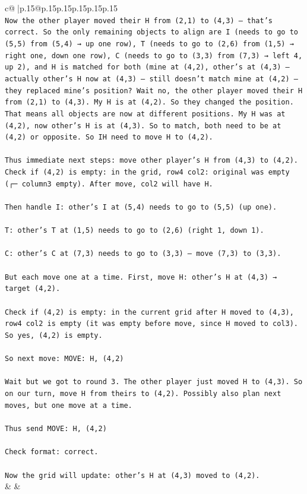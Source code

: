 \documentclass{article}
\begin{document}
{\begin{supertabular}{c@{$\;$}|p{.15\linewidth}@{}p{.15\linewidth}p{.15\linewidth}p{.15\linewidth}p{.15\linewidth}p{.15\linewidth}}
{{{\\ 
\texttt{Now the other player moved their H from (2,1) to (4,3) – that's correct. So the only remaining objects to align are I (needs to go to (5,5) from (5,4) → up one row), T (needs to go to (2,6) from (1,5) → right one, down one row), C (needs to go to (3,3) from (7,3) → left 4, up 2), and H is matched for both (mine at (4,2), other's at (4,3) – actually other's H now at (4,3) – still doesn't match mine at (4,2) – they replaced mine's position? Wait no, the other player moved their H from (2,1) to (4,3). My H is at (4,2). So they changed the position. That means all objects are now at different positions. My H was at (4,2), now other's H is at (4,3). So to match, both need to be at (4,2) or opposite. So IH need to move H to (4,2).} \\
\\ 
\texttt{Thus immediate next steps: move other player's H from (4,3) to (4,2). Check if (4,2) is empty: in the grid, row4 col2: original was empty (┌─ column3 empty). After move, col2 will have H.} \\
\\ 
\texttt{Then handle I: other's I at (5,4) needs to go to (5,5) (up one).} \\
\\ 
\texttt{T: other's T at (1,5) needs to go to (2,6) (right 1, down 1).} \\
\\ 
\texttt{C: other's C at (7,3) needs to go to (3,3) – move (7,3) to (3,3).} \\
\\ 
\texttt{But each move one at a time. First, move H: other's H at (4,3) → target (4,2).} \\
\\ 
\texttt{Check if (4,2) is empty: in the current grid after H moved to (4,3), row4 col2 is empty (it was empty before move, since H moved to col3). So yes, (4,2) is empty.} \\
\\ 
\texttt{So next move: MOVE: H, (4,2)} \\
\\ 
\texttt{Wait but we got to round 3. The other player just moved H to (4,3). So on our turn, move H from theirs to (4,2). Possibly also plan next moves, but one move at a time.} \\
\\ 
\texttt{Thus send MOVE: H, (4,2)} \\
\\ 
\texttt{Check format: correct.} \\
\\ 
\texttt{Now the grid will update: other's H at (4,3) moved to (4,2).} \\
            }
        }
    }
    & & \\ \\


\end{supertabular}}
\end{document}

